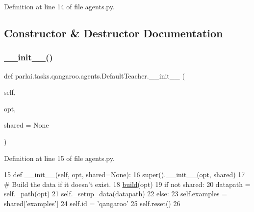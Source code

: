 Definition at line 14 of file agents.\+py.



\subsection{Constructor \& Destructor Documentation}
\mbox{\label{classparlai_1_1tasks_1_1qangaroo_1_1agents_1_1DefaultTeacher_aa46ac201bb6d53bc9333a97cbe4d3b41}} 
\subsubsection{\texorpdfstring{\+\_\+\+\_\+init\+\_\+\+\_\+()}{\_\_init\_\_()}}
{\footnotesize\ttfamily def parlai.\+tasks.\+qangaroo.\+agents.\+Default\+Teacher.\+\_\+\+\_\+init\+\_\+\+\_\+ (\begin{DoxyParamCaption}\item[{}]{self,  }\item[{}]{opt,  }\item[{}]{shared = {\ttfamily None} }\end{DoxyParamCaption})}



Definition at line 15 of file agents.\+py.


\begin{DoxyCode}
15     \textcolor{keyword}{def }\_\_init\_\_(self, opt, shared=None):
16         super().\_\_init\_\_(opt, shared)
17         \textcolor{comment}{# Build the data if it doesn't exist.}
18         \hyperlink{namespaceparlai_1_1mturk_1_1tasks_1_1talkthewalk_1_1download_a8c0fbb9b6dfe127cb8c1bd6e7c4e33fd}{build}(opt)
19         \textcolor{keywordflow}{if} \textcolor{keywordflow}{not} shared:
20             datapath = self.\_path(opt)
21             self.\_setup\_data(datapath)
22         \textcolor{keywordflow}{else}:
23             self.examples = shared[\textcolor{stringliteral}{'examples'}]
24         self.id = \textcolor{stringliteral}{'qangaroo'}
25         self.reset()
26 
\end{DoxyCode}


